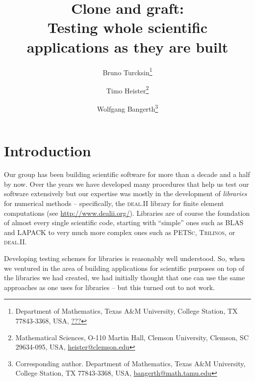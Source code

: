 \documentclass{article}
\newcommand{\dealii}{{\textsc{deal.II}}}
\newcommand{\trilinos}{{\textsc{Trilinos}}}
\newcommand{\petsc}{\textsc{PETSc}}
\begin{document}

\title{Clone and graft:\\ Testing whole scientific
  applications as they are built}

\author{Bruno Turcksin\footnote{Department of Mathematics, Texas A\&M
    University, College Station, TX 77843-3368, USA, \url{???}}
\and
   Timo Heister\footnote{Mathematical Sciences, O-110 Martin Hall, Clemson University,
     Clemson, SC 29634-095, USA, \url{heister@clemson.edu}}
\and
   Wolfgang Bangerth\footnote{Corresponding author. Department of Mathematics, Texas A\&M
     University, College Station, TX 77843-3368, USA, \url{bangerth@math.tamu.edu}}}


\maketitle

\section{Introduction}

Our group has been building scientific software for more than a decade and a
half by now. Over the years we have developed many procedures that help us
test our software extensively but our expertise was mostly in the development
of \textit{libraries} for numerical methods -- specifically, the \dealii{}
library for finite element computations (see
\url{http://www.dealii.org/}). Libraries are of course the foundation of
almost every single scientific code, starting with ``simple'' ones such as
BLAS and LAPACK to very much more complex ones such as \petsc{}, \trilinos{}, or
\dealii{}.

Developing testing schemes for libraries is reasonably well understood. So,
when we ventured in the area of building applications for scientific purposes
on top of the libraries we had created, we had initially thought that one can
use the same approaches as one uses for libraries -- but this turned out to
not work.
\end{document}
